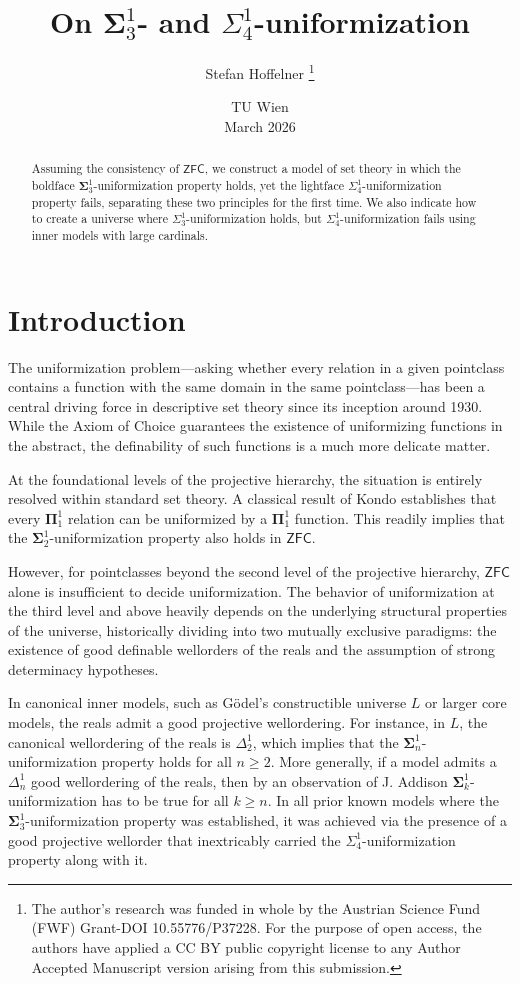 \documentclass{article}
\title{On \texorpdfstring{$\mathbf{\Sigma}^1_3$}{Sigma13}- and \texorpdfstring{$\Sigma^1_4$}{Sigma14}-uniformization}
\author{Stefan Hoffelner \footnote{The author's research was funded in whole by the Austrian Science Fund (FWF) Grant-DOI 10.55776/P37228. For the purpose of open access, the authors have applied a CC BY public copyright license to any Author Accepted Manuscript version arising from this submission.}}
\date{
    TU Wien \\
    March 2026
}
\theoremstyle{plain}
\theoremstyle{definition}
\begin{document}
\maketitle

\begin{abstract}
    Assuming the consistency of $\mathsf{ZFC}$, we construct a model of set theory in which the boldface $\mathbf{\Sigma}^1_3$-uniformization property holds, yet the lightface $\Sigma^1_4$-uniformization property fails, separating these two principles for the first time. We also indicate how to create a universe where $\Sigma^1_3$-uniformization holds, but $\Sigma^1_4$-uniformization fails using inner models with large cardinals. 
\end{abstract}

\section{Introduction}

The uniformization problem---asking whether every relation in a given pointclass contains a function with the same domain in the same pointclass---has been a central driving force in descriptive set theory since its inception around 1930. While the Axiom of Choice guarantees the existence of uniformizing functions in the abstract, the definability of such functions is a much more delicate matter. 

At the foundational levels of the projective hierarchy, the situation is entirely resolved within standard set theory. A classical result of Kondo \cite{Kondo1939} establishes that every $\mathbf{\Pi}^1_1$ relation can be uniformized by a $\mathbf{\Pi}^1_1$ function. This readily implies that the $\mathbf{\Sigma}^1_2$-uniformization property also holds in $\mathsf{ZFC}$. 

However, for pointclasses beyond the second level of the projective hierarchy, $\mathsf{ZFC}$ alone is insufficient to decide uniformization. The behavior of uniformization at the third level and above heavily depends on the underlying structural properties of the universe, historically dividing into two mutually exclusive paradigms: the existence of good definable wellorders of the reals and the assumption of strong determinacy hypotheses.

In canonical inner models, such as G\"{o}del's constructible universe $L$ or larger core models, the reals admit a good projective wellordering. For instance, in $L$, the canonical wellordering of the reals is $\Delta^1_2$, which  implies that the $\mathbf{\Sigma}^1_n$-uniformization property holds for all $n \geq 2$. More generally, if a model admits a $\Delta^1_n$ good wellordering of the reals, then by an observation of J. Addison $\mathbf{\Sigma}^1_k$-uniformization has to be true for all $k \geq n$. In all prior known models where the $\mathbf{\Sigma}^1_3$-uniformization property was established, it was achieved via the presence of a good projective wellorder that inextricably carried the ${\Sigma}^1_4$-uniformization property along with it. 
\end{document}
